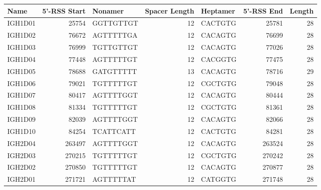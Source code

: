 \begin{tabular}{lrlrlrr}
  \toprule Name & 5'-RSS Start & Nonamer & Spacer Length & Heptamer & 5'-RSS End & Length \\ 
  \midrule IGH1D01 & 25754 & GGTTGTTGT & 12 & CACTGTG & 25781 & 28 \\ 
  IGH1D02 & 76672 & AGTTTTTGA & 12 & CACAGTG & 76699 & 28 \\ 
  IGH1D03 & 76999 & TGTTGTTGT & 12 & CACAGTG & 77026 & 28 \\ 
  IGH1D04 & 77448 & AGTTTTTGT & 12 & CACGGTG & 77475 & 28 \\ 
  IGH1D05 & 78688 & GATGTTTTT & 13 & CACAGTG & 78716 & 29 \\ 
  IGH1D06 & 79021 & TGTTTTTGT & 12 & CGCTGTG & 79048 & 28 \\ 
  IGH1D07 & 80417 & AGTTTTGGT & 12 & CACAGTG & 80444 & 28 \\ 
  IGH1D08 & 81334 & TGTTTTTGT & 12 & CGCTGTG & 81361 & 28 \\ 
  IGH1D09 & 82039 & AGTTTTGGT & 12 & CACAGTG & 82066 & 28 \\ 
  IGH1D10 & 84254 & TCATTCATT & 12 & CACTGTG & 84281 & 28 \\ 
  IGH2D04 & 263497 & AGTTTTGGT & 12 & CACAGTG & 263524 & 28 \\ 
  IGH2D03 & 270215 & TGTTTTTGT & 12 & CGCTGTG & 270242 & 28 \\ 
  IGH2D02 & 270850 & TGTTTTTGT & 12 & CACAGTG & 270877 & 28 \\ 
  IGH2D01 & 271721 & AGTTTTTAT & 12 & CATGGTG & 271748 & 28 \\ 
   \bottomrule \end{tabular}
